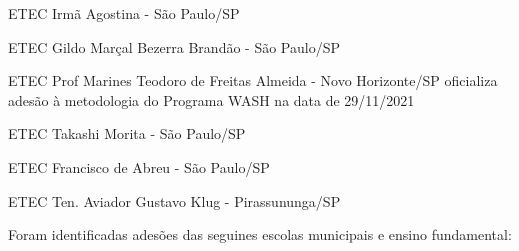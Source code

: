 \documentclass[
12pt,		%
openright,	%
twoside,  %
a4paper,			%
chapter=TITLE,		%
english,			%
french,				%
spanish,			%
brazil				%
]{USPSC-classe/USPSC}
\begin{document}
\begin{alineas}
\item ETEC Irm\~a Agostina - S\~ao Paulo/SP
\item ETEC Gildo Mar\c{c}al Bezerra Brand\~ao - S\~ao Paulo/SP
\item ETEC Prof Marines Teodoro de Freitas Almeida - Novo Horizonte/SP oficializa ades\~ao \`a metodologia do Programa WASH na  data de 29/11/2021
\item ETEC Takashi Morita - S\~ao Paulo/SP
\item ETEC Francisco de Abreu - S\~ao Paulo/SP
\item ETEC Ten. Aviador Gustavo Klug - Pirassununga/SP
\end{alineas}

Foram identificadas ades\~oes das seguines escolas municipais e ensino fundamental:
\end{document}
